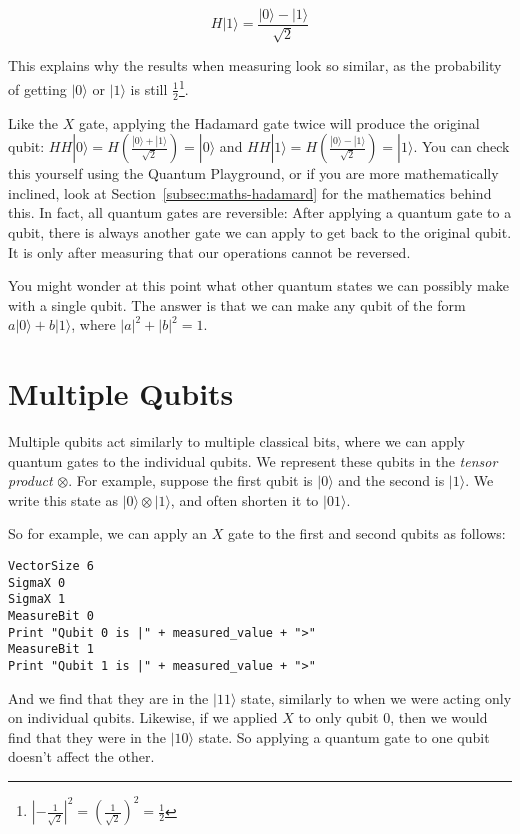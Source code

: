 \documentclass[twocolumn]{article}
\begin{document}
$$H|1\rangle = \frac{|0\rangle - |1\rangle}{\sqrt{2}}$$

This explains why the results when measuring look so similar, as the probability of getting $|0\rangle$ or $|1\rangle$ is still $\frac{1}{2}$\footnote{$\left|-\frac{1}{\sqrt{2}}\right|^2 = \left(\frac{1}{\sqrt{2}}\right)^2 = \frac{1}{2}$}.

Like the $X$ gate, applying the Hadamard gate twice will produce the original qubit: $HH|0\rangle = H\left(\frac{|0\rangle + |1\rangle}{\sqrt{2}}\right) = |0\rangle$ and $HH|1\rangle = H\left(\frac{|0\rangle - |1\rangle}{\sqrt{2}}\right) = |1\rangle$. You can check this yourself using the Quantum Playground, or if you are more mathematically inclined, look at Section~\ref{subsec:maths-hadamard} for the mathematics behind this. In fact, all quantum gates are reversible: After applying a quantum gate to a qubit, there is always another gate we can apply to get back to the original qubit. It is only after measuring that our operations cannot be reversed.

You might wonder at this point what other quantum states we can possibly make with a single qubit. The answer is that we can make any qubit of the form $a|0\rangle + b|1\rangle$, where $|a|^2 + |b|^2 = 1$.

\section{Multiple Qubits}

Multiple qubits act similarly to multiple classical bits, where we can apply quantum gates to the individual qubits. We represent these qubits in the {\em tensor product} $\otimes$. For example, suppose the first qubit is $|0\rangle$ and the second is $|1\rangle$. We write this state as $|0\rangle \otimes |1\rangle$, and often shorten it to $|01\rangle$.

So for example, we can apply an $X$ gate to the first and second qubits as follows:

\begin{lstlisting}
VectorSize 6
SigmaX 0
SigmaX 1
MeasureBit 0
Print "Qubit 0 is |" + measured_value + ">"
MeasureBit 1
Print "Qubit 1 is |" + measured_value + ">"
\end{lstlisting}

And we find that they are in the $|11\rangle$ state, similarly to when we were acting only on individual qubits. Likewise, if we applied $X$ to only qubit $0$, then we would find that they were in the $|10\rangle$ state. So applying a quantum gate to one qubit doesn't affect the other.
\end{document}
